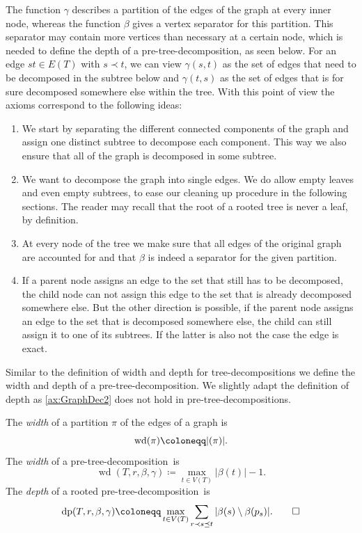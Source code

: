 \documentclass{lmcs}
\theoremstyle{plain}\newtheorem{claim}[thm]{Claim}   %
\DeclareMathOperator{\dep}{dp}
\DeclareMathOperator{\wid}{wd}
\let\boundary\relax
\newcommand{\boundary}{\Delta}
\newcommand{\preTreeDec}{pre-tree-decomposition}
\begin{document}
The function $\gamma$ describes a partition of the edges of the graph at every inner node, whereas the function $\beta$ gives a vertex separator for this partition.
This separator may contain more vertices than necessary at a certain node, which is needed to define the depth of a \preTreeDec, as seen below.
For an edge $st\in E(T)$ with $s\prec t$, we can view $\gamma(s,t)$ as the set of edges that need to be decomposed in the subtree below and $\gamma(t,s)$ as the set of edges that is for sure decomposed somewhere else within the tree.
With this point of view the axioms correspond to the following ideas:
\begin{enumerate}[label=(PD.\arabic*), labelindent=0pt, itemindent=*, leftmargin=*]
	\item We start by separating the different connected components of the graph and assign one distinct subtree to decompose each component. This way we also ensure that all of the graph is decomposed in some subtree.
	\item We want to decompose the graph into single edges. We do allow empty leaves and even empty subtrees, to ease our cleaning up procedure in the following sections. The reader may recall that the root of a rooted tree is never a leaf, by definition.
	\item At every node of the tree we make sure that all edges of the original graph are accounted for and that $\beta$ is indeed a separator for the given partition.
	\item If a parent node assigns an edge to the set that still has to be decomposed, the child node can not assign this edge to the set that is already decomposed somewhere else. But the other direction is possible, if the parent node assigns an edge to the set that is decomposed somewhere else, the child can still assign it to one of its subtrees. If the latter is also not the case the edge is exact.
\end{enumerate}

Similar to the definition of width and depth for tree-decompositions we define the width and depth of a \preTreeDec.
We slightly adapt the definition of depth as \ref{ax:GraphDec2} does not hold in \preTreeDec s.

\begin{defi}
	The \emph{width} of a partition $\pi$ of the edges of a graph is
	\[
	\wid(\pi)\coloneqq|\boundary(\pi)|.
	\]
	The \emph{width} of a \preTreeDec\ is
	\[
	\wid(T,r,\beta,\gamma)\coloneqq\max_{t\in V(T)} |\beta(t)| - 1.
	\]
	The \emph{depth} of a rooted \preTreeDec\ is
	\[
	\dep(T,r,\beta,\gamma) \coloneqq \max_{t\in V(T)} \sum_{r\prec s\preceq t} |\beta(s) \setminus \beta(p_s)|.\qedhere
	\]
\end{defi}
\end{document}
